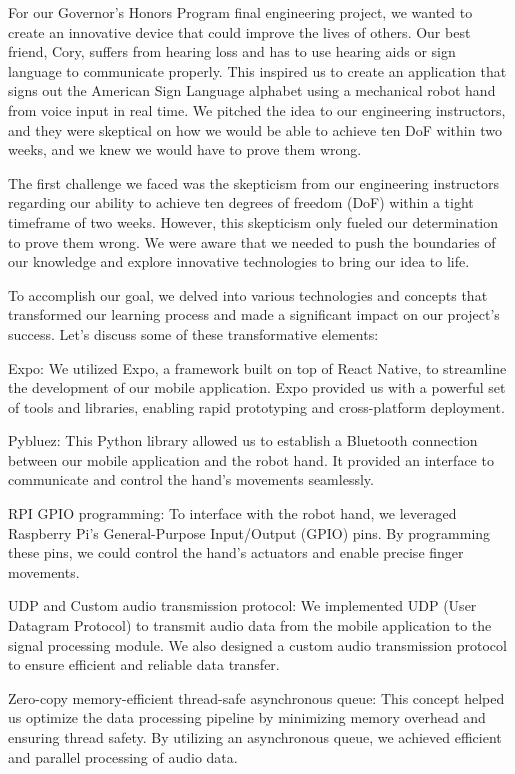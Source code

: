 For our Governor's Honors Program final engineering project, we wanted to create an innovative device that could improve the lives of others. Our best friend, Cory, suffers from hearing loss and has to use hearing aids or sign language to communicate properly. This inspired us to create an application that signs out the American Sign Language alphabet using a mechanical robot hand from voice input in real time. We pitched the idea to our engineering instructors, and they were skeptical on how we would be able to achieve ten DoF within two weeks, and we knew we would have to prove them wrong. 

The first challenge we faced was the skepticism from our engineering instructors regarding our ability to achieve ten degrees of freedom (DoF) within a tight timeframe of two weeks. However, this skepticism only fueled our determination to prove them wrong. We were aware that we needed to push the boundaries of our knowledge and explore innovative technologies to bring our idea to life.

To accomplish our goal, we delved into various technologies and concepts that transformed our learning process and made a significant impact on our project's success. Let's discuss some of these transformative elements:

Expo: We utilized Expo, a framework built on top of React Native, to streamline the development of our mobile application. Expo provided us with a powerful set of tools and libraries, enabling rapid prototyping and cross-platform deployment.

Pybluez: This Python library allowed us to establish a Bluetooth connection between our mobile application and the robot hand. It provided an interface to communicate and control the hand's movements seamlessly.

RPI GPIO programming: To interface with the robot hand, we leveraged Raspberry Pi's General-Purpose Input/Output (GPIO) pins. By programming these pins, we could control the hand's actuators and enable precise finger movements.

UDP and Custom audio transmission protocol: We implemented UDP (User Datagram Protocol) to transmit audio data from the mobile application to the signal processing module. We also designed a custom audio transmission protocol to ensure efficient and reliable data transfer.

Zero-copy memory-efficient thread-safe asynchronous queue: This concept helped us optimize the data processing pipeline by minimizing memory overhead and ensuring thread safety. By utilizing an asynchronous queue, we achieved efficient and parallel processing of audio data.

